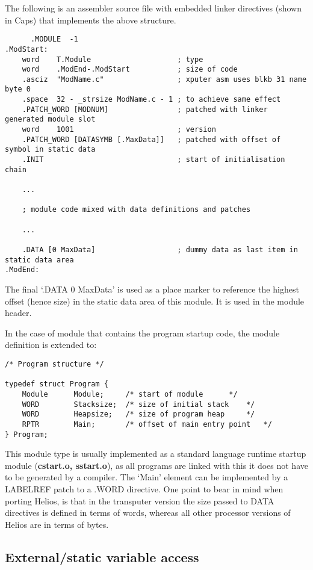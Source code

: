 The following is an assembler source file with embedded linker directives
(shown in Caps) that implements the above structure.
\scriptsize
\begin{verbatim}
      .MODULE  -1
.ModStart:
    word    T.Module                    ; type
    word    .ModEnd-.ModStart           ; size of code
    .asciz  "ModName.c"                 ; xputer asm uses blkb 31 name byte 0
    .space  32 - _strsize ModName.c - 1 ; to achieve same effect
    .PATCH_WORD [MODNUM]                ; patched with linker generated module slot
    word    1001                        ; version
    .PATCH_WORD [DATASYMB [.MaxData]]   ; patched with offset of symbol in static data
    .INIT                               ; start of initialisation chain

    ...

    ; module code mixed with data definitions and patches

    ...

    .DATA [0 MaxData]                   ; dummy data as last item in static data area
.ModEnd:
\end{verbatim}
\normalsize

The final `.DATA 0 MaxData' is used as a place marker to reference the
highest offset (hence size) in the static data area of this module. It is
used in the module header.

In the case of module that contains the program startup code, the module
definition is extended to:

\scriptsize
\begin{verbatim}
/* Program structure */

typedef struct Program {
	Module		Module;		/* start of module		*/
	WORD		Stacksize;	/* size of initial stack	*/
	WORD		Heapsize;	/* size of program heap		*/
	RPTR		Main;		/* offset of main entry point	*/
} Program;
\end{verbatim}
\normalsize

This module type is usually implemented as a standard language runtime
startup module ({\bf cstart.o, sstart.o}), 
as all programs are linked with this it does not have to be generated
by a compiler.
The `Main' element can be implemented by a LABELREF patch to a .WORD
directive.
One point to bear in mind when porting Helios, is
that in the transputer version the size passed to DATA directives is
defined in terms of words, whereas all other processor versions of
Helios are in terms of bytes.

\subsection{External/static variable access}

